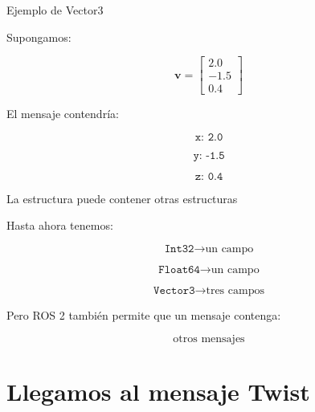 \documentclass[aspectratio=169]{beamer}
\begin{document}
\begin{frame}{Ejemplo de Vector3}

    Supongamos:

    \[
    \mathbf{v}
    =
    \begin{bmatrix}
        2.0\\
        -1.5\\
        0.4
    \end{bmatrix}
    \]

    El mensaje contendría:

    \[
    \texttt{x: 2.0}
    \]

    \[
    \texttt{y: -1.5}
    \]

    \[
    \texttt{z: 0.4}
    \]

    \vspace{-0.3cm}


\end{frame}

\begin{frame}{La estructura puede contener otras estructuras}

    Hasta ahora tenemos:

    \[
    \texttt{Int32}
    \rightarrow
    \text{un campo}
    \]

    \[
    \texttt{Float64}
    \rightarrow
    \text{un campo}
    \]

    \[
    \texttt{Vector3}
    \rightarrow
    \text{tres campos}
    \]

    Pero ROS 2 también permite que un mensaje contenga:

    \[
    \boxed{\text{otros mensajes}}
    \]

    \vspace{0.3cm}


\end{frame}

\section{Llegamos al mensaje Twist}
\end{document}
